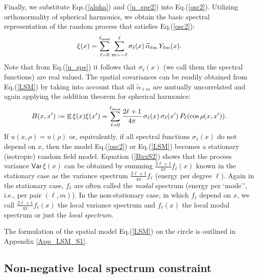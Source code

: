 \documentclass[12pt]{article}
\DeclareMathOperator{\Ex}{\mathbb{E}}
\newcommand{\Var}{{\mathsf{Var}}\,}
\newcommand{\ie}{i.e., }
\begin{document}
Finally, we substitute Eqs.(\ref{alpha}) and (\ref{u_spe2}) into Eq.(\ref{osc2}).
Utilizing orthonormality of spherical harmonics, we  obtain the basic spectral
representation of the random process that satisfies Eq.(\ref{osc2}):
%
\begin {equation}
\label{LSM}
\xi (x) = \sum^{\ell_{\rm max}}_{\ell=0} \sum^\ell_{m=-\ell}  \sigma_\ell(x)  
                          \,\widetilde\alpha_{\ell m} \, Y_{\ell m} (x).
\end {equation}
%
Note that from Eq.(\ref{u_spe}) it follows that $\sigma_\ell(x)$ 
(we call them the  spectral functions)
are real valued.
The spatial covariances can be readily obtained from Eq.(\ref{LSM}) by taking into account
that all $\widetilde\alpha_{\ell m}$ are mutually uncorrelated and
again applying  the addition theorem for spherical harmonics:
%
\begin {equation}
\label{BxxS2}
B(x,x') := \Ex \xi (x) \xi (x') =  \sum^{\ell_{\rm max}}_{\ell=0}  \frac{2\ell +1}{4\pi}   
                          \,\sigma_\ell(x) \, \sigma_\ell(x')\, P_\ell(\cos \rho(x,x')).
\end {equation}
%
If $u(x, \rho) = u(\rho)$ or, equivalently, if all spectral functions $\sigma_\ell(x)$ do not depend on $x$,
then the model Eq.(\ref{osc2}) or Eq.(\ref{LSM}) 
 becomes a stationary (isotropic) random field model.
Equation (\ref{BxxS2}) shows that the process variance 
$\Var \xi (x)$ can be obtained by summing 
$\frac{2\ell +1}{4\pi} f_\ell(x)$ known in the stationary case as 
the variance spectrum $\frac{2\ell +1}{4\pi} f_\ell$ (energy per degree $\ell$).
Again in the stationary case, $f_\ell$ are often called the 
{\em modal} spectrum  (energy per `mode'', \ie per pair $(\ell,m)$).
In the non-stationary case, in which $f_\ell$ depend on $x$, we call 
$\frac{2\ell +1}{4\pi} f_\ell(x)$ the local variance spectrum
and $f_\ell(x)$ the local modal spectrum or just the {\em local spectrum}.

 
The formulation of the spatial model Eq.(\ref{LSM}) on the circle is outlined in Appendix \ref{App_LSM_S1}.




\subsection {Non-negative local spectrum constraint}
\label{sec_nonneg_spec}
\end{document}
